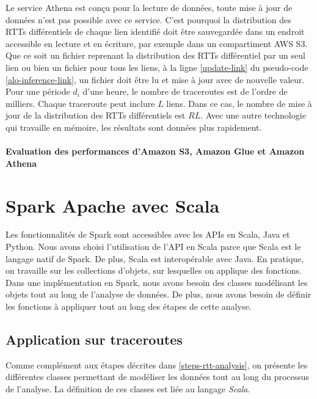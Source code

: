 Le service Athena est conçu pour la lecture de données, toute mise à jour de données n'est pas possible avec ce service. C'est pourquoi la distribution des RTTs différentiels de chaque  lien identifié doit être sauvegardée dans un endroit accessible en lecture et en écriture, par exemple dans un compartiment AWS S3. Que ce soit un fichier reprenant la distribution des RTTs différentiel  par un seul lien ou bien un fichier pour tous les liens,   à la ligne  \ref{update-link} du pseudo-code \ref{alo-inference-link}, un fichier doit être lu et mise à jour avec de nouvelle valeur. Pour une période $d_i$ d'une heure, le nombre de traceroutes est de l'ordre de milliers. Chaque traceroute peut inclure $L$ liens. Dans ce cas, le nombre de mise à jour de la distribution des RTTs différentiels est $R$\texttimes$L$. Avec une autre technologie qui travaille en mémoire, les résultats sont données plus rapidement. 



\paragraph{Evaluation des performances d'Amazon S3, Amazon Glue  et Amazon Athena }




\section{Spark Apache avec Scala}

Les fonctionnalités de Spark sont accessibles avec les  APIs en Scala, Java et Python. Nous avons choisi l'utilisation de l'API en Scala parce que Scala est le langage natif de Spark. De plus, Scala est interopérable avec Java.  En pratique, on travaille sur les collections d'objets, sur lesquelles on applique des fonctions. Dans une implémentation en Spark, nous avons besoin des classes modélisant les objets tout au long de l'analyse de données. De plus, nous avons besoin de définir les fonctions à appliquer tout au long des étapes de cette analyse.

\subsection{Application sur traceroutes} \label{application:spark}
Comme complément aux étapes décrites dans \ref{steps-rtt-analysis}, on présente les différentes classes permettant de modéliser les données tout au long du processus de l'analyse. La définition de ces classes est liée au langage \textit{Scala}. 

